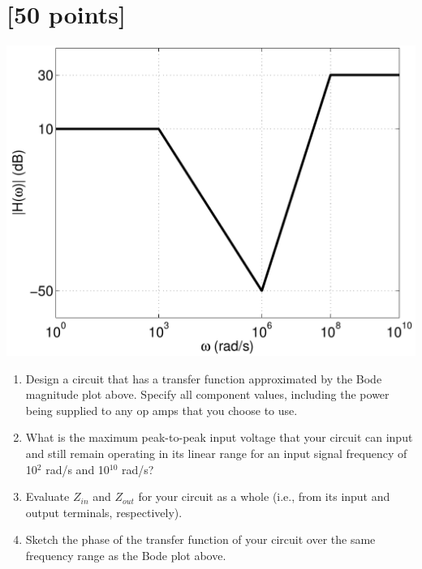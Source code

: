 

\section{[50 points]}

\begin{center}
\includegraphics[width=0.5\linewidth]{filter_design_bode_plot}
\end{center}

\begin{enumerate}
    \item Design a circuit that has a transfer function approximated by the Bode magnitude plot above.  Specify all component values, including the power being supplied to any op amps that you choose to use.
    \item What is the maximum peak-to-peak input voltage that your circuit can input and still remain operating in its linear range for an input signal frequency of 10$^2$ rad/s and 10$^{10}$ rad/s?
    \item Evaluate $Z_{in}$ and $Z_{out}$ for your circuit as a whole (i.e., from its input and output terminals, respectively).
    \item Sketch the phase of the transfer function of your circuit over the same frequency range as the Bode plot above.
\end{enumerate}

\clearpage



\clearpage



\clearpage
